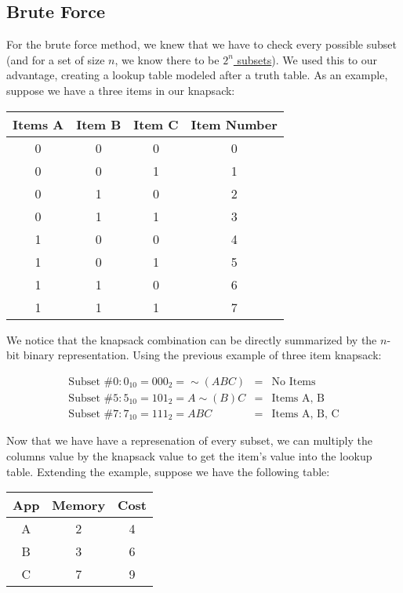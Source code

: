 \documentclass{article}
\begin{document}
\subsection{Brute Force}
For the brute force method, we knew that we have to check every possible subset (and for a set of size $n$, we know there to be \href{http://mathworld.wolfram.com/Subset.html}{$2^n$ subsets}). We used this to our advantage, creating a lookup table modeled after a truth table. As an example, suppose we have a three items in our knapsack:

\begin{center}
    \begin{tabular}{|c|c|c|c|}
        \hline
        Items A & Item B & Item C & Item Number  \\ \hline
        0 & 0 & 0 & 0\\
        0 & 0 & 1 & 1\\
        0 & 1 & 0 & 2\\
        0 & 1 & 1 & 3\\
        1 & 0 & 0 & 4\\
        1 & 0 & 1 & 5\\
        1 & 1 & 0 & 6\\
        1 & 1 & 1 & 7\\
        \hline
    \end{tabular}
\end{center}

We notice that the knapsack combination can be directly summarized by the $n$-bit binary representation. Using the previous example of three item knapsack:

\begin{eqnarray}
    \text{Subset \#0}: 0_{10} = 000_{2} = \sim(ABC) & = & \text{No Items} \\
    \text{Subset \#5}: 5_{10} = 101_{2} = A\sim(B)C & = & \text{Items A, B} \\
    \text{Subset \#7}: 7_{10} = 111_{2} = ABC & = & \text{Items A, B, C}
\end{eqnarray}

Now that we have have a represenation of every subset, we can multiply the columns value by the knapsack value to get the item's value into the lookup table. Extending the example, suppose we have the following table:

\begin{center}
    \begin{tabular}{|c|c|c|}
        \hline
        App & Memory & Cost \\ \hline
        A & 2 & 4 \\
        B & 3 & 6 \\
        C & 7 & 9 \\
        \hline
    \end{tabular}
\end{center}
\end{document}
